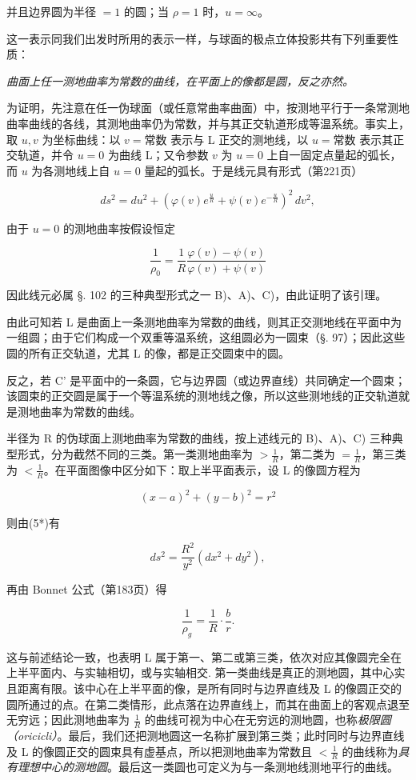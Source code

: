 并且边界圆为半径 $=1$ 的圆；当 $\rho=1$ 时，$u=\infty$。



这一表示同我们出发时所用的表示一样，与球面的极点立体投影共有下列重要性质：

\emph{曲面上任一测地曲率为常数的曲线，在平面上的像都是圆，反之亦然。}



为证明，先注意在任一伪球面（或任意常曲率曲面）中，按测地平行于一条常测地曲率曲线的各线，其测地曲率仍为常数，并与其正交轨道形成等温系统。事实上，取 \(u,v\) 为坐标曲线：以 \(v=\text{常数}\) 表示与 L 正交的测地线，以 \(u=\text{常数}\) 表示其正交轨道，并令 \(u=0\) 为曲线 L；又令参数 \(v\) 为 \(u=0\) 上自一固定点量起的弧长，而 \(u\) 为各测地线上自 \(u=0\) 量起的弧长。于是线元具有形式（第221页）

\[
 ds^2=du^2+\left(\varphi(v)e^{\frac uR}+\psi(v)e^{-\frac uR}\right)^2\,dv^2,
\]

由于 $u=0$ 的测地曲率按假设恒定

\[
 \frac1{\rho_0}=\frac1R\frac{\varphi(v)-\psi(v)}{\varphi(v)+\psi(v)}
\]

因此线元必属 §. 102 的三种典型形式之一 B)、A)、C)，由此证明了该引理。



由此可知若 L 是曲面上一条测地曲率为常数的曲线，则其正交测地线在平面中为一组圆；由于它们构成一个双重等温系统，这组圆必为一圆束（§. 97）；因此这些圆的所有正交轨道，尤其 L 的像，都是正交圆束中的圆。



反之，若 C' 是平面中的一条圆，它与边界圆（或边界直线）共同确定一个圆束；该圆束的正交圆是属于一个等温系统的测地线之像，所以这些测地线的正交轨道就是测地曲率为常数的曲线。



半径为 R 的伪球面上测地曲率为常数的曲线，按上述线元的 B)、A)、C) 三种典型形式，分为截然不同的三类。第一类测地曲率为 $>\frac1R$，第二类为 $=\frac1R$，第三类为 $<\frac1R$。在平面图像中区分如下：取上半平面表示，设 L 的像圆方程为

\[
 (x-a)^2+(y-b)^2=r^2
\]

则由(5*)有

\[
 ds^2=\frac{R^2}{y^2}(dx^2+dy^2),
\]

再由 Bonnet 公式（第183页）得

\[
 \frac1{\rho_g}=\frac1R\cdot\frac br.
\]

这与前述结论一致，也表明 L 属于第一、第二或第三类，依次对应其像圆完全在上半平面内、与实轴相切，或与实轴相交. 第一类曲线是真正的测地圆，其中心实且距离有限。该中心在上半平面的像，是所有同时与边界直线及 L 的像圆正交的圆所通过的点。在第二类情形，此点落在边界直线上，而其在曲面上的客观点退至无穷远；因此测地曲率为 $\frac1R$ 的曲线可视为中心在无穷远的测地圆，也称\emph{极限圆（oricicli）}。最后，我们还把测地圆这一名称扩展到第三类；此时同时与边界直线及 L 的像圆正交的圆束具有虚基点，所以把测地曲率为常数且 $<\frac1R$ 的曲线称为\emph{具有理想中心的测地圆}。最后这一类圆也可定义为与一条测地线测地平行的曲线。




